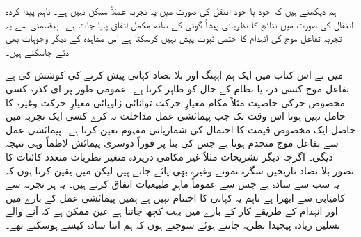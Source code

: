 ہم دیکھتے ہیں کہ خود با خود انتقل کی صورت میں یہ تجربہ عملاً ممکن نہیں ہے۔ تاہم پیدا کردہ انتقال کی صورت میں نتائج کا نظریاتی پیشاً گوئی کے ساتھ مکمل اتفاق پایا جات ہے۔ بدقسمتی سے یہ تجربہ تفاعل موج کی انہدام کا ختمی ثبوت پیش نہیں کرسکتا ہے اس مشاہدہ کے دیگر وجوہات بھی دئے جاسکتے ہیں۔ 

میں نے اس کتاب میں ایک ہم اہہنگ اور بلا تضاد کہانی پیش کرنے کی کوشش کی ہے تفاعل موج  کسی ذرہ یا نظام کے حال کو ظاہر کرتا ہے۔ عمومی طور پر ای کذرہ کسی مخصوص حرکی خاصیت مثلاً مکام معیارِ حرکت توانائی زاویائی معیارِ حرکت وغیرہ کا حامل نہیں ہوتا اس وقت تک  جب پیمائشی عمل مداخلت نہ کرے کسی ایک تجربہ میں حاصل ایک مخصوص قیمت کا احتمال  کی شماریاتی مفہوم تعین کرتا ہے۔ پیمائشی عمل سے تفاعل موج منحدم ہوتا ہے جس کی بنا پر فوراً دوسری پیمائش لاظماً وہی نتیجہ دیگی۔ اگرچہ دیگر تشریحات مثلاً غیر مکامی درپردہ متغیر نظریات متعدد کائنات کا تصور بلا تضاد تاریخیں سگرہ نمونے وغیرہ بھی پائے جاتے ہیں لیکن میں یقین کرتا ہوں کہ یہ سب سے سادہ ہے جس سے عموماً ماہرِ طبیعیات اتفاق کرتے ہیں۔ یہ ہر تجربہ سے کامیابی سے ابھرا ہے تاہم یہ کہانی کا اختتام نہیں ہے ہمیں پیمائشی عمل کے بارے میں اور انہدام کے طریقے کار کے بارے میں بہت کچھ جاننا ہے عین ممکن ہے کہ آنے والے نسلیں زیادہ پیچیدا نظریہ جانتے ہوئے سوچتے ہوں کہ ہم اتنا سادہ کیسے ہوسکتے تھے۔

